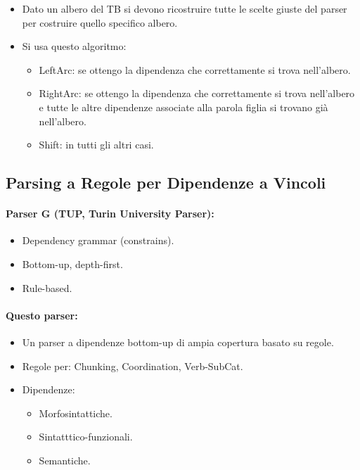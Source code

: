 \begin{itemize}
  \item Dato un albero del TB si devono ricostruire tutte le scelte giuste del parser per costruire quello specifico albero. 
  \item Si usa questo algoritmo: 
    \begin{itemize}
      \item LeftArc: se ottengo la dipendenza che correttamente si trova nell'albero. 
      \item RightArc: se ottengo la dipendenza che correttamente si trova nell'albero e tutte le altre dipendenze associate alla parola figlia si trovano già nell'albero. 
      \item Shift: in tutti gli altri casi.
    \end{itemize}
\end{itemize}

\subsection{Parsing a Regole per Dipendenze a Vincoli}

\paragraph{Parser G (TUP, Turin University Parser):}

\begin{itemize}
  \item Dependency grammar (constrains). 
  \item Bottom-up, depth-first. 
  \item Rule-based.
\end{itemize}

\paragraph{Questo parser:}

\begin{itemize}
  \item Un parser a dipendenze bottom-up di ampia
copertura basato su regole. 
\item Regole per: Chunking, Coordination, Verb-SubCat. 
\item Dipendenze: 
  \begin{itemize}
    \item Morfosintattiche. 
    \item Sintatttico-funzionali. 
    \item Semantiche.
  \end{itemize}
\end{itemize}








